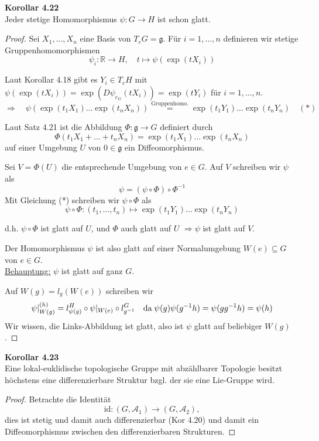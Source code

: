 \documentclass[fleqn, 12pt, letterpaper]{article}
\newcommand{\txt}[1]{\text{#1}}
\begin{document}
\textbf{Korollar 4.22}\\
Jeder stetige Homomorphismus $\psi \colon G \to H$ ist schon glatt.
\begin{proof}
    Sei $X_1, \dots, X_n$ eine Basis von $T_e G=\mathfrak{g}$. Für $i = 1, \dots, n$ definieren wir stetige Gruppenhomomorphismen
\[
\psi_i \colon \mathbb{R} \to H, \quad
t \mapsto \psi(\exp(t X_i))
\]

Laut Korollar 4.18 gibt es $Y_i \in T_e H$ mit $\psi(\exp(t X_i)) = \exp(D\psi_{e_G}(tX_i))= \exp(t Y_i)$ \quad für $i = 1, \dots, n$.
\[
\Rightarrow \quad
\psi\left( \exp(t_1 X_1) \dots \exp(t_n X_n) \right)
\overset{\txt{Gruppenhomo.}}{=} \exp(t_1 Y_1) \dots \exp(t_n Y_n) \quad (*)
\]

Laut Satz 4.21 ist die Abbildung $\Phi \colon \mathfrak{g} \to G$ definiert durch
\[
\Phi(t_1 X_1 + \dots + t_n X_n) = \exp(t_1 X_1) \dots \exp(t_n X_n)
\]
auf einer Umgebung $U$ von $0 \in \mathfrak{g}$ ein Diffeomorphismus.

Sei $V = \Phi(U)$ die entsprechende Umgebung von $e \in G$. Auf $V$ schreiben wir $\psi$ als
\[
\psi = (\psi \circ \Phi) \circ \Phi^{-1}
\]
Mit Gleichung (*) schreiben wir $\psi \circ \Phi$ als
\[
\psi \circ \Phi \colon (t_1, \dots, t_n) \mapsto \exp(t_1 Y_1) \dots \exp(t_n Y_n)
\]

d.h. $\psi \circ \Phi$ ist glatt auf $U$, und $\Phi$ auch glatt auf $U$ $\Rightarrow \psi$ ist glatt auf $V$.

Der Homomorphismus $\psi$ ist also glatt auf einer Normalumgebung $W(e) \subseteq G$ von $e \in G$.\\

\underline{Behauptung:} $\psi$ ist glatt auf ganz $G$.

Auf $W(g) = l_g(W(e))$ schreiben wir
\[
\psi|_{W(g)}^{(h)} = l_{\psi(g)}^H \circ \psi|_{W(e)} \circ l_{g^{-1}}^G \quad \txt{da\;} \psi(g)\psi(g^{-1}h) = \psi(gg^{-1}h) = \psi(h)
\]
Wir wissen, die Links-Abbildung ist glatt, also ist $\psi$ glatt auf beliebiger $W(g)$.
\end{proof}

\textbf{Korollar 4.23}\\
Eine lokal-euklidische topologische Gruppe mit abzählbarer Topologie besitzt höchstens eine differenzierbare Struktur bzgl. der sie eine Lie-Gruppe wird.

\begin{proof}
    Betrachte die Identität 
\[
\mathrm{id}:(G, \mathscr{A}_1) \to (G, \mathscr{A}_2),
\]
dies ist stetig und damit auch differenzierbar (Kor 4.20) und damit ein Diffeomorphismus zwischen den differenzierbaren Strukturen.
\end{proof}
\end{document}
